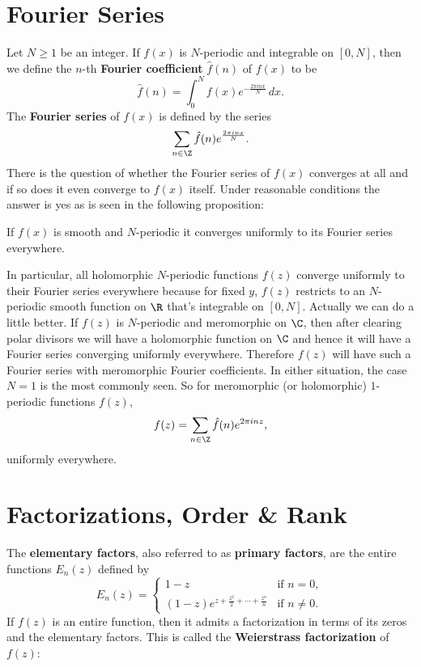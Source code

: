   \section{Fourier Series}\label{append:Fourier_Series}
    Let $N \ge 1$ be an integer. If $f(x)$ is $N$-periodic and integrable on $[0,N]$, then we define the $n$-th \textbf{Fourier coefficient} $\hat{f}(n)$ of $f(x)$ to be
    \[
      \hat{f}(n) = \int_{0}^{N}f(x)e^{-\frac{2\pi inx}{N}}\,dx.
    \]
    The \textbf{Fourier series} of $f(x)$ is defined by the series
    \[
      \sum_{n \in \Z}\hat{f}(n)e^{\frac{2\pi inx}{N}}.
    \]
    There is the question of whether the Fourier series of $f(x)$ converges at all and if so does it even converge to $f(x)$ itself. Under reasonable conditions the answer is yes as is seen in the following proposition:

    \begin{proposition}
      If $f(x)$ is smooth and $N$-periodic it converges uniformly to its Fourier series everywhere.
    \end{proposition}

    In particular, all holomorphic $N$-periodic functions $f(z)$ converge uniformly to their Fourier series everywhere because for fixed $y$, $f(z)$ restricts to an $N$-periodic smooth function on $\R$ that's integrable on $[0,N]$. Actually we can do a little better. If $f(z)$ is $N$-periodic and meromorphic on $\C$, then after clearing polar divisors we will have a holomorphic function on $\C$ and hence it will have a Fourier series converging uniformly everywhere. Therefore $f(z)$ will have such a Fourier series with meromorphic Fourier coefficients. In either situation, the case $N = 1$ is the most commonly seen. So for meromorphic (or holomorphic) $1$-periodic functions $f(z)$,
    \[
      f(z) = \sum_{n \in \Z}\hat{f}(n)e^{2\pi inz},
    \]
    uniformly everywhere.
  \section{Factorizations, Order \& Rank}\label{append:Factorizations_and_Finite_Order}
    The \textbf{elementary factors}, also referred to as \textbf{primary factors}, are the entire functions $E_{n}(z)$ defined by
    \[
      E_{n}(z) = \begin{cases} 1-z & \text{if } n = 0, \\ (1-z)e^{z+\frac{z^{2}}{2}+\cdots+\frac{z^{n}}{n}} & \text{if } n \neq 0. \end{cases}
    \]
    If $f(z)$ is an entire function, then it admits a factorization in terms of its zeros and the elementary factors. This is called the \textbf{Weierstrass factorization} of $f(z)$:

